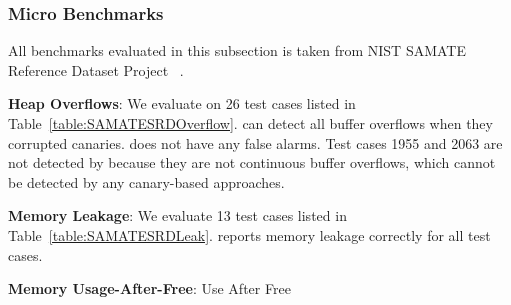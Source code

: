 
\subsubsection{Micro Benchmarks}
All benchmarks evaluated in this subsection is taken from NIST SAMATE Reference Dataset Project ~\cite{microbenchmarks}.

{\bf Heap Overflows}: We evaluate \doubletake{} on 26 test cases listed in Table~\ref{table:SAMATESRDOverflow}. \doubletake{} can detect all buffer overflows when they corrupted canaries. \doubletake{} does not have any false alarms. Test cases 1955 and 2063 are not detected by \doubletake{} because they are not continuous buffer overflows, which cannot be detected by any canary-based approaches.

{\bf Memory Leakage}: We evaluate 13 test cases listed in Table~\ref{table:SAMATESRDLeak}. \doubletake{} reports memory leakage correctly for all test cases.  

{\bf Memory Usage-After-Free}: 
{Use After Free}
  
